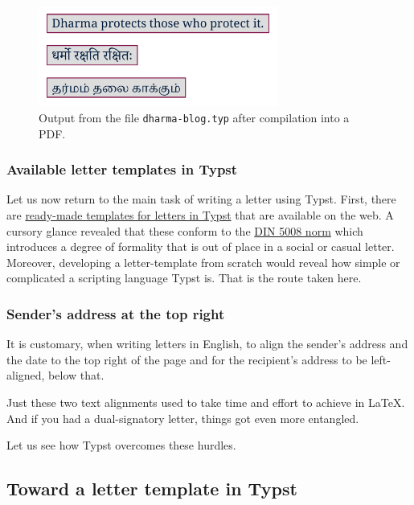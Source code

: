 \documentclass[
  a4paper,
]{article}
\begin{document}
\begin{figure}
\centering
\includegraphics[width=0.7\textwidth,height=\textheight]{images/dharma.png}
\caption{Output from the file \texttt{dharma-blog.typ} after compilation
into a PDF.}\label{fig:dharma}
\end{figure}

\subsubsection{Available letter templates in
Typst}\label{available-letter-templates-in-typst}

Let us now return to the main task of writing a letter using Typst.
First, there are
\href{https://github.com/qjcg/awesome-typst\#letters}{ready-made
templates for letters in Typst} that are available on the web. A cursory
glance revealed that these conform to the
\href{https://en.wikipedia.org/wiki/DIN_5008}{DIN 5008 norm} which
introduces a degree of formality that is out of place in a social or
casual letter. Moreover, developing a letter-template from scratch would
reveal how simple or complicated a scripting language Typst is. That is
the route taken here.

\subsubsection{Sender's address at the top
right}\label{senders-address-at-the-top-right}

It is customary, when writing letters in English, to align the sender's
address and the date to the top right of the page and for the
recipient's address to be left-aligned, below that.

Just these two text alignments used to take time and effort to achieve
in LaTeX. And if you had a dual-signatory letter, things got even more
entangled.

Let us see how Typst overcomes these hurdles.

\subsection{Toward a letter template in
Typst}\label{toward-a-letter-template-in-typst}
\end{document}
